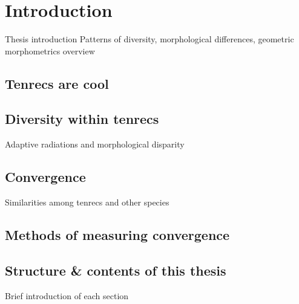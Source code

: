 \chapter{Introduction}
\label{chap:introduction}



\noindent
Thesis introduction
Patterns of diversity, morphological differences, geometric morphometrics overview

\section{Tenrecs are cool}




\section{Diversity within tenrecs}

Adaptive radiations and morphological disparity

\section{Convergence}
Similarities among tenrecs and other species

\section{Methods of measuring convergence}

\section{Structure \& contents of this thesis}
Brief introduction of each section
%
%
%


